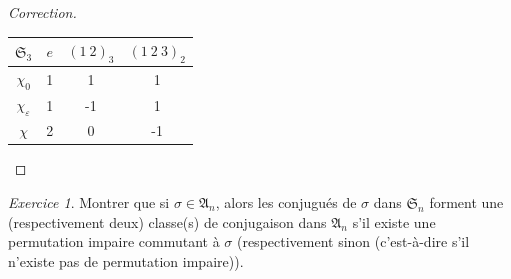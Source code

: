 \documentclass[french]{book}
\theoremstyle{definition}
\theoremstyle{remark}
\newtheorem{exo}{Exercice}
\begin{document}
\begin{proof}[Correction]
\begin{enumerate}
\begin{enumerate}
      \begin{center}
        \begin{tabular}{|c|c|c|c|}
          \hline
          \(\mathfrak{S}_{3}\) & \(e\) & \((1 \ 2) _{3}\) & \((1 \ 2 \ 3) _{2}\) \\
          \hline
          \(\chi_0\) & 1 & 1 & 1 \\
          \hline
          \(\chi _{\varepsilon}\) & 1 & -1 & 1 \\
          \hline
          \(\chi\) & 2 & 0 & -1 \\
          \hline
        \end{tabular}
      \end{center}
    \end{enumerate}
  \end{enumerate}
\end{proof}

\begin{exo}
  Montrer que si \(\sigma \in \mathfrak{A}_n\), alors les conjugués de \(\sigma\) dans \(\mathfrak{S}_n\) forment une (respectivement deux) classe(s) de conjugaison dans \(\mathfrak{A}_n\) s'il existe une permutation impaire commutant à \(\sigma\) (respectivement sinon (c'est-à-dire s'il n'existe pas de permutation impaire)).
\end{exo}
\end{document}
